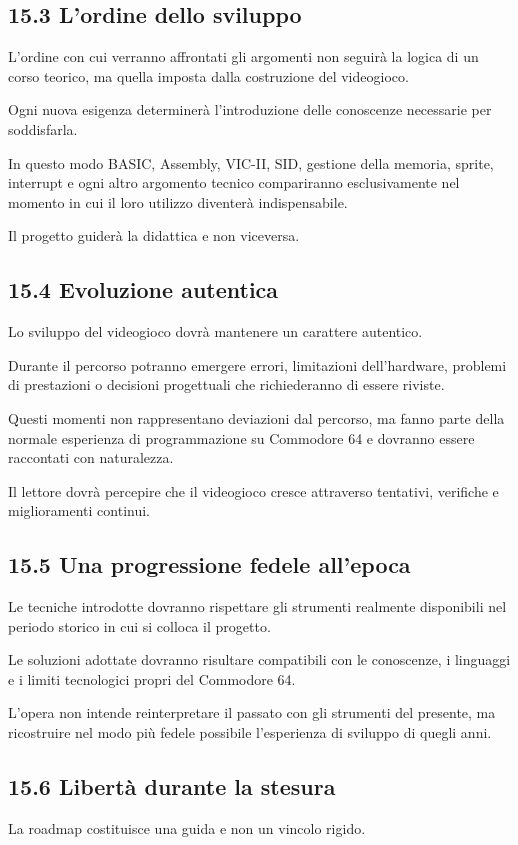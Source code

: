 \documentclass{article}
\begin{document}
\subsection[15.3 L{}'ordine dello sviluppo]{15.3 L'ordine dello sviluppo}
L'ordine con cui verranno affrontati gli argomenti non seguirà la logica di un corso teorico, ma quella imposta dalla
costruzione del videogioco.

Ogni nuova esigenza determinerà l'introduzione delle conoscenze necessarie per soddisfarla.

In questo modo BASIC, Assembly, VIC-II, SID, gestione della memoria, sprite, interrupt e ogni altro argomento tecnico
compariranno esclusivamente nel momento in cui il loro utilizzo diventerà indispensabile.

Il progetto guiderà la didattica e non viceversa.

\subsection{15.4 Evoluzione autentica}
Lo sviluppo del videogioco dovrà mantenere un carattere autentico.

Durante il percorso potranno emergere errori, limitazioni dell'hardware, problemi di prestazioni o decisioni progettuali
che richiederanno di essere riviste.

Questi momenti non rappresentano deviazioni dal percorso, ma fanno parte della normale esperienza di programmazione su
Commodore 64 e dovranno essere raccontati con naturalezza.

Il lettore dovrà percepire che il videogioco cresce attraverso tentativi, verifiche e miglioramenti continui.

\subsection[15.5 Una progressione fedele all{}'epoca]{15.5 Una progressione fedele all'epoca}
Le tecniche introdotte dovranno rispettare gli strumenti realmente disponibili nel periodo storico in cui si colloca il
progetto.

Le soluzioni adottate dovranno risultare compatibili con le conoscenze, i linguaggi e i limiti tecnologici propri del
Commodore 64.

L'opera non intende reinterpretare il passato con gli strumenti del presente, ma ricostruire nel modo più fedele
possibile l'esperienza di sviluppo di quegli anni.

\subsection{15.6 Libertà durante la stesura}
La roadmap costituisce una guida e non un vincolo rigido.
\end{document}
